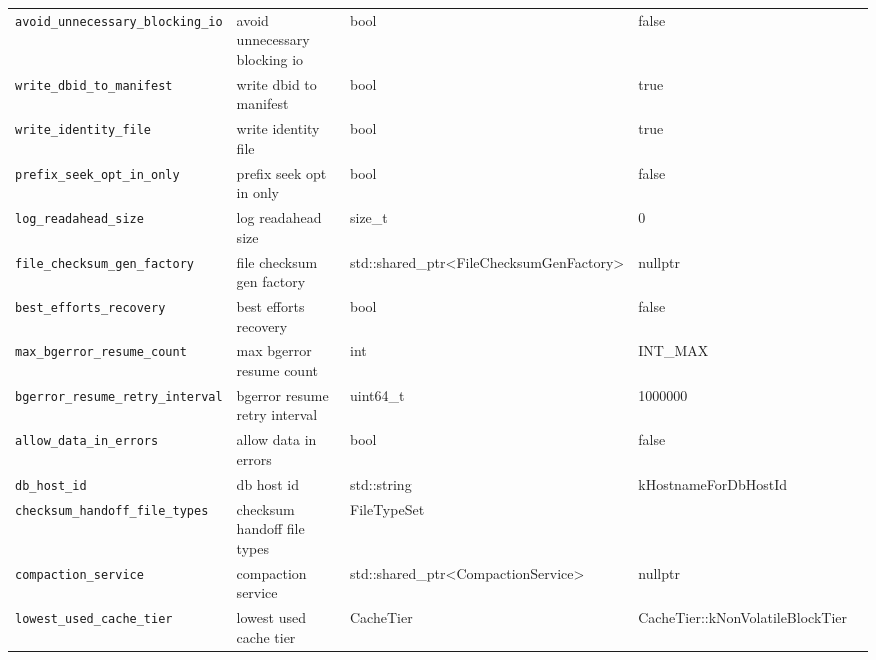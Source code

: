 {{\begin{longtable}{@{}p{3.4cm}p{5.0cm}p{3.6cm}p{2.5cm}p{2.6cm}@{}}
    \texttt{avoid\_unnecessary\_blocking\_io}
    & avoid unnecessary blocking io
    & bool
    & false
    & \\

    \texttt{write\_dbid\_to\_manifest}
    & write dbid to manifest
    & bool
    & true
    & \\

    \texttt{write\_identity\_file}
    & write identity file
    & bool
    & true
    & \\

    \texttt{prefix\_seek\_opt\_in\_only}
    & prefix seek opt in only
    & bool
    & false
    & \\

    \texttt{log\_readahead\_size}
    & log readahead size
    & size\_t
    & 0
    & \\

    \texttt{file\_checksum\_gen\_factory}
    & file checksum gen factory
    & std::shared\_ptr\textless{}FileChecksumGenFactory\textgreater{}
    & nullptr
    & \\

    \texttt{best\_efforts\_recovery}
    & best efforts recovery
    & bool
    & false
    & \\

    \texttt{max\_bgerror\_resume\_count}
    & max bgerror resume count
    & int
    & INT\_MAX
    & \\

    \texttt{bgerror\_resume\_retry\_interval}
    & bgerror resume retry interval
    & uint64\_t
    & 1000000
    & \\

    \texttt{allow\_data\_in\_errors}
    & allow data in errors
    & bool
    & false
    & \\

    \texttt{db\_host\_id}
    & db host id
    & std::string
    & kHostnameForDbHostId
    & \\

    \texttt{checksum\_handoff\_file\_types}
    & checksum handoff file types
    & FileTypeSet
    & 
    & \\

    \texttt{compaction\_service}
    & compaction service
    & std::shared\_ptr\textless{}CompactionService\textgreater{}
    & nullptr
    & \\

    \texttt{lowest\_used\_cache\_tier}
    & lowest used cache tier
    & CacheTier
    & CacheTier::kNonVolatileBlockTier
    & \\


\end{longtable}}}
